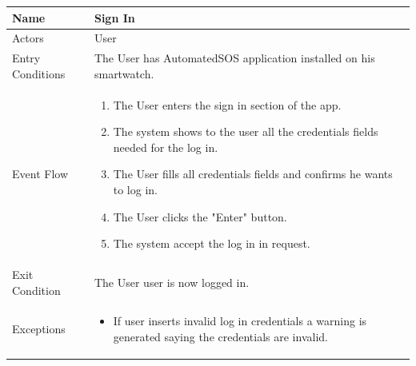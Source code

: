 \begin{enumerate}
\FloatBarrier
\begin{table}[h]
\begin{tabular}{|l|p{}|}
\hline
Name             & Sign In \\ \hline
Actors           & User  \\ \hline
Entry Conditions & The User has AutomatedSOS application installed on his smartwatch.    \\ \hline
Event Flow       & \begin{enumerate}
			\item The User enters the sign in section of the app.
            \item The system shows to the user all the credentials fields needed for the log in.
            \item The User fills all credentials fields and confirms he wants to log in.
            \item The User clicks the "Enter" button.
            \item The system accept the log in in request.
        \end{enumerate}\\ \hline
Exit Condition   & The User user is now logged in.\\ \hline
Exceptions       & \begin{itemize}
\item If user inserts invalid log in credentials a warning is generated saying the credentials are invalid.
\end{itemize}\\ \hline
\end{tabular}
\end{table}
\FloatBarrier


\end{enumerate}
